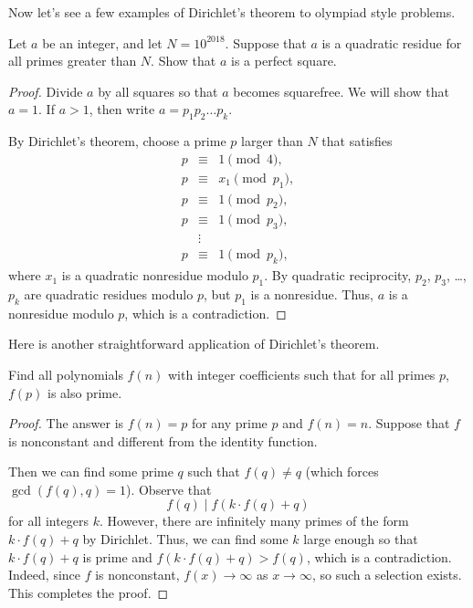 \documentclass{scrartcl}
\begin{document}
Now let's see a few examples of Dirichlet's theorem to olympiad style problems. 

\begin{example}
	Let $a$ be an integer, and let $N=10^{2018}$. 
	Suppose that $a$ is a quadratic residue for all primes greater than $N$. 
	Show that $a$ is a perfect square. 
\end{example}

\begin{proof}
	Divide $a$ by all squares so that $a$ becomes squarefree. We will show that $a=1$. 
	If $a>1$, then write $a = p_1p_2\dots p_k$. 
	
	By Dirichlet's theorem, choose a prime $p$ larger than $N$ that satisfies 
	\begin{eqnarray*}
		p &\equiv& 1 \pmod 4, \\
		p &\equiv& x_1 \pmod {p_1}, \\
		p &\equiv& 1 \pmod {p_2}, \\
		p &\equiv& 1 \pmod {p_3}, \\
		& \vdots & \\
		p & \equiv& 1 \pmod {p_k},
	\end{eqnarray*}
	where $x_1$ is a quadratic nonresidue modulo $p_1$. 
	By quadratic reciprocity, $p_2$, $p_3$, \dots, $p_k$ are quadratic residues modulo $p$, 
	but $p_1$ is a nonresidue. Thus, $a$ is a nonresidue modulo $p$, which is a contradiction.  
\end{proof}

Here is another straightforward application of Dirichlet's theorem. 

\begin{example}
	Find all polynomials $f(n)$ with integer coefficients such that for all primes $p$, 
	$f(p)$ is also prime. 
\end{example}

\begin{proof}
	The answer is $f(n)=p$ for any prime $p$ and $f(n)=n$. 
	Suppose that $f$ is nonconstant and different from the identity function. 
	
	Then we can find some prime $q$ such that $f(q)\neq q$ (which forces $\gcd(f(q), q)=1$). 
	Observe that $$f(q)\mid f(k\cdot f(q)+q)$$ 
	for all integers $k$. However, there are infinitely many primes of the form $k\cdot f(q)+q$ by 
	Dirichlet. Thus, we can find some $k$ large enough so that $k\cdot f(q)+q$ is prime and 
	$f(k\cdot f(q)+q)>f(q)$, which is a contradiction. Indeed, since $f$ is nonconstant, 
	$f(x)\rightarrow \infty$ as $x\rightarrow \infty$, so such a selection exists.  
	This completes the proof. 
\end{proof}
\end{document}
